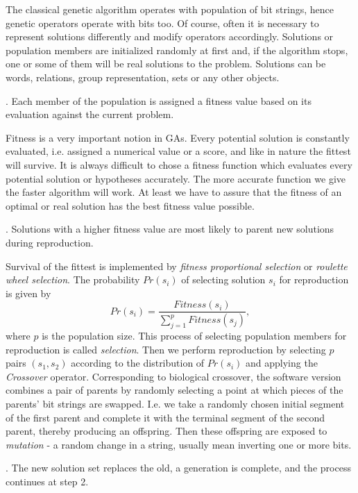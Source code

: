 \documentclass{article}
\begin{document}
The classical genetic algorithm operates with population of bit
strings, hence genetic operators operate with bits too. Of course,
often it is necessary to represent solutions differently and modify
operators accordingly. Solutions or population members are initialized
randomly at first and, if the algorithm stops, one or some of them
will be real solutions to the problem. Solutions can be words,
relations, group representation, sets or any other objects.

\vspace{3mm}
. Each member of the population is assigned a fitness value based on
its evaluation against the current problem.
\vspace{3mm}

Fitness is a very important notion in GAs. Every potential solution is
constantly evaluated, i.e. assigned a numerical value or a score, and
like in nature the fittest will survive. It is always difficult to
chose a fitness function which evaluates every potential solution or
hypotheses accurately. The more accurate function we give the faster
algorithm will work. At least we have to assure that the fitness of an
optimal or real solution has the best fitness value possible.

\vspace{3mm}
. Solutions with a higher fitness value are most likely to parent new
solutions during reproduction.
\vspace{3mm}

Survival of the fittest is implemented by {\em fitness proportional
selection} or {\em roulette wheel selection}.  The probability
$Pr(s_i)$ of selecting solution $s_i$ for reproduction is given by
\[
	Pr(s_i) = \frac{Fitness(s_i)}{\sum_{j=1}^p Fitness(s_j)},
\]
where $p$ is the population size. This process of selecting population
members for reproduction is called {\em selection}. Then we perform
reproduction by selecting $p$ pairs $(s_1,s_2)$ according to the
distribution of $Pr(s_i)$ and applying the {\em Crossover} operator.
Corresponding to biological crossover, the software version combines a
pair of parents by randomly selecting a point at which pieces of the
parents' bit strings are swapped. I.e. we take a randomly chosen
initial segment of the first parent and complete it with the terminal
segment of the second parent, thereby producing an offspring. Then
these offspring are exposed to {\em mutation} - a random change in a
string, usually mean inverting one or more bits. 

\vspace{3mm}
. The new solution set replaces the old, a generation is complete,
and the process continues at step 2.
\vspace{3mm}
\end{document}
